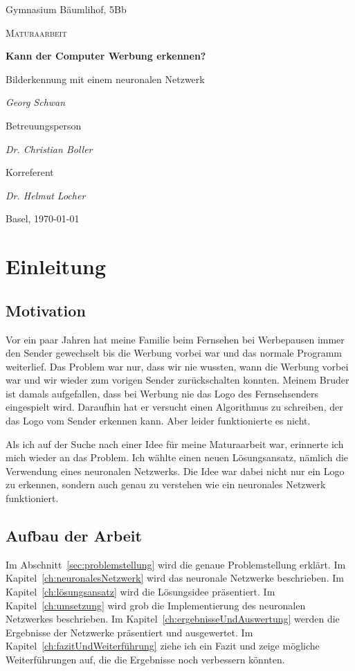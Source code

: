 \documentclass[12pt,a4paper]{report}
\begin{document}
\begin{titlepage}
	\centering
	{\Large Gymnasium Bäumlihof, 5Bb \par}
	\vspace{1cm}
	{\LARGE\scshape Maturaarbeit\par}
	\vspace{1.5cm}
	{\huge\bfseries Kann der Computer Werbung erkennen?\par}
	\vspace{0.6cm}
    {\Large Bilderkennung mit einem neuronalen Netzwerk\par}
	\vspace{2cm}
	{\Large\itshape Georg Schwan\par}
	\vfill
	Betreuungsperson\par
	{\itshape Dr. Christian Boller\par}
	Korreferent\par
	{\itshape Dr. Helmut Locher}
	\vfill
	{\large Basel, \today\par}
\end{titlepage}

\tableofcontents

\chapter{Einleitung}\label{ch:einleitung}

\section{Motivation}
\label{sec:motivation}
Vor ein paar Jahren hat meine Familie beim Fernsehen bei Werbepausen immer den Sender gewechselt
bis die Werbung vorbei war und das normale Programm weiterlief.
Das Problem war nur, dass wir nie wussten, wann die Werbung vorbei war und wir wieder zum vorigen Sender zurückschalten konnten.
Meinem Bruder ist damals aufgefallen, dass bei Werbung nie das Logo des Fernsehsenders eingespielt wird.
Daraufhin hat er versucht einen Algorithmus zu schreiben, der das Logo vom Sender erkennen kann.
Aber leider funktionierte es nicht.

Als ich auf der Suche nach einer Idee für meine Maturaarbeit war, erinnerte ich mich wieder an das Problem.
Ich wählte einen neuen Lösungsansatz, nämlich die Verwendung eines neuronalen Netzwerks.
Die Idee war dabei nicht nur ein Logo zu erkennen, sondern auch genau zu verstehen wie ein neuronales Netzwerk funktioniert.
\section{Aufbau der Arbeit}
\label{sec:aufbauDerArbeit}
Im Abschnitt~\ref{sec:problemstellung} wird die genaue Problemstellung erklärt.
Im Kapitel~\ref{ch:neuronalesNetzwerk} wird das neuronale Netzwerke beschrieben.
Im Kapitel~\ref{ch:lösungsansatz} wird die Lösungsidee präsentiert.
Im Kapitel~\ref{ch:umsetzung} wird grob die Implementierung des neuronalen Netzwerkes beschrieben.
Im Kapitel~\ref{ch:ergebnisseUndAuswertung} werden die Ergebnisse der Netzwerke präsentiert und ausgewertet.
Im Kapitel~\ref{ch:fazitUndWeiterführung} ziehe ich ein Fazit und zeige mögliche Weiterführungen auf, die die Ergebnisse noch verbessern könnten.
\end{document}
